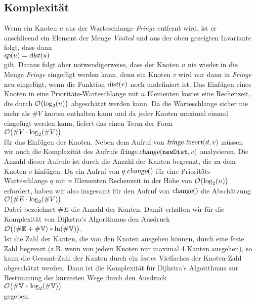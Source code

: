 \subsection{Komplexit\"at}
Wenn ein Knoten $u$ aus der Warteschlange \textsl{Fringe} entfernt wird, ist er anschlie\3end ein Element der
Menge \textsl{Visited} und aus der oben gezeigten Invariante folgt, dass dann 
\\[0.2cm]
\hspace*{1.3cm}
$\textsl{sp}(u) = \textsl{dist}(u)$
\\[0.2cm]
gilt.  Daraus folgt aber notwendigerweise, dass der Knoten $u$ nie wieder in die Menge \textsl{Fringe}
eingef\"ugt werden kann, denn ein Knoten $v$ wird nur dann in \textsl{Fringe} neu eingef\"ugt, wenn die Funktion
$\textsl{dist}(v)$ noch undefiniert ist.  Das Einf\"ugen eines Knoten in eine Priorit\"ats-Warteschlange mit $n$
Elementen kostet eine Rechenzeit, die durch $\mathcal{O}\bigl(\log_2(n)\bigr)$ abgesch\"atzt werden kann.  Da die
Warteschlange sicher nie mehr als $\#V$ knoten enthalten kann und da jeder Knoten maximal einmal eingef\"ugt
werden kann, liefert das einen Term der Form 
\\[0.2cm]
\hspace*{1.3cm}
$\mathcal{O}\bigl(\#V \cdot \log_2(\#V)\bigr)$ 
\\[0.2cm]
f\"ur das Einf\"ugen der Knoten.  Neben dem Aufruf von $\textsl{fringe}.\textsl{insert}(d,v)$ m\"ussen
wir auch die Komplexit\"at des Aufrufs $\textsl{fringe}.\textsl{change}(\mathtt{newDist}, v)$ analysieren.
Die Anzahl dieser Aufrufe ist durch die Anzahl der Kanten begrenzt, die zu dem Knoten $v$ hinf\"ugen.
Da ein Aufruf von $q.\textsl{change}()$ f\"ur eine Priorit\"ats-Warteschlange $q$ mit $n$ Elementen Rechenzeit
in der H\"ohe von $\mathcal{O}\bigl(\log_2(n)\bigr)$ erfordert, haben wir also insgesamt f\"ur den Aufruf von
$\textsl{change}()$ die Absch\"atzung
\\[0.2cm]
\hspace*{1.3cm}
$\mathcal{O}\bigl(\#E \cdot \log_2(\#V)\bigr)$
\\[0.2cm]
Dabei bezeichnet $\#E$ die Anzahl der Kanten. Damit erhalten wir f\"ur die
Komplexit\"at von Dijkstra's Algorithmus den Ausdruck \\[0.2cm]
\hspace*{1.3cm} $\mathcal{O}\bigl((\#{\mathbb E} + \#{\mathbb V}) * \ln(\#{\mathbb V})\bigr)$. \\[0.2cm]
Ist die Zahl der Kanten, die von den Knoten ausgehen k\"onnen, durch eine feste Zahl begrenzt
(z.B. wenn von jedem Knoten nur maximal 4 Kanten ausgehen), so
kann  die Gesamt-Zahl der Kanten durch ein festes Vielfaches der Knoten-Zahl abgesch\"atzt
werden.  Dann ist  die Komplexit\"at f\"ur Dijkstra's Algorithmus zur  Bestimmung der k\"urzesten Wege
durch den Ausdruck  
\\[0.2cm]
\hspace*{1.3cm}
$\mathcal{O}\bigl(\#{\mathbb V} * \log_2(\#{\mathbb V})\bigr)$ 
\\[0.2cm]
gegeben.




